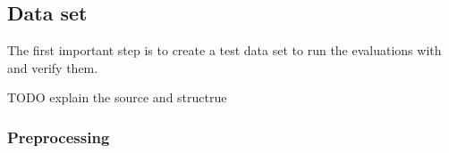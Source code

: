 \subsection{Data set}

The first important step is to create a test data set to run the evaluations with and verify them.

TODO explain the source and structrue

\subsubsection{Preprocessing}

